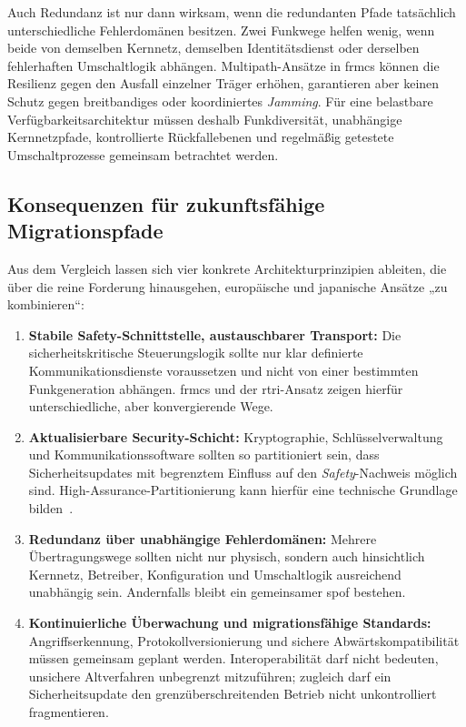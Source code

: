 \documentclass[runningheads]{res/llncs}
\begin{document}
Auch Redundanz ist nur dann wirksam, wenn die redundanten Pfade tatsächlich unterschiedliche Fehlerdomänen besitzen. Zwei Funkwege helfen wenig, wenn beide von demselben Kernnetz, demselben Identitätsdienst oder derselben fehlerhaften Umschaltlogik abhängen. Multipath-Ansätze in \gls{frmcs} können die Resilienz gegen den Ausfall einzelner Träger erhöhen, garantieren aber keinen Schutz gegen breitbandiges oder koordiniertes \textit{Jamming}. Für eine belastbare Verfügbarkeitsarchitektur müssen deshalb Funkdiversität, unabhängige Kernnetzpfade, kontrollierte Rückfallebenen und regelmäßig getestete Umschaltprozesse gemeinsam betrachtet werden.

\subsection{Konsequenzen für zukunftsfähige Migrationspfade}
\label{sec:Zukunftsfähige_Migrationspfade_FRMCS_und_IEC_62280}
Aus dem Vergleich lassen sich vier konkrete Architekturprinzipien ableiten, die über die reine Forderung hinausgehen, europäische und japanische Ansätze „zu kombinieren“:

\begin{enumerate}
    \item \textbf{Stabile Safety-Schnittstelle, austauschbarer Transport:} Die sicherheitskritische Steuerungslogik sollte nur klar definierte Kommunikationsdienste voraussetzen und nicht von einer bestimmten Funkgeneration abhängen. \gls{frmcs} und der \gls{rtri}-Ansatz zeigen hierfür unterschiedliche, aber konvergierende Wege.
    \item \textbf{Aktualisierbare Security-Schicht:} Kryptographie, Schlüsselverwaltung und Kommunikationssoftware sollten so partitioniert sein, dass Sicherheitsupdates mit begrenztem Einfluss auf den \textit{Safety}-Nachweis möglich sind. High-Assurance-Partitionierung kann hierfür eine technische Grundlage bilden~\parencite[S. 31--35]{schulzIntegration2019}.
    \item \textbf{Redundanz über unabhängige Fehlerdomänen:} Mehrere Übertragungswege sollten nicht nur physisch, sondern auch hinsichtlich Kernnetz, Betreiber, Konfiguration und Umschaltlogik ausreichend unabhängig sein. Andernfalls bleibt ein gemeinsamer \gls{spof} bestehen.
    \item \textbf{Kontinuierliche Überwachung und migrationsfähige Standards:} Angriffserkennung, Protokollversionierung und sichere Abwärtskompatibilität müssen gemeinsam geplant werden. Interoperabilität darf nicht bedeuten, unsichere Altverfahren unbegrenzt mitzuführen; zugleich darf ein Sicherheitsupdate den grenzüberschreitenden Betrieb nicht unkontrolliert fragmentieren.
\end{enumerate}
\end{document}
